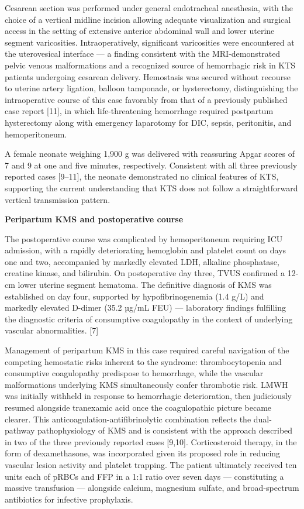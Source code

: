 \documentclass[
  letterpaper,
  DIV=11,
  numbers=noendperiod]{scrartcl}
\begin{document}
Cesarean section was performed under general endotracheal anesthesia,
with the choice of a vertical midline incision allowing adequate
visualization and surgical access in the setting of extensive anterior
abdominal wall and lower uterine segment varicosities. Intraoperatively,
significant varicosities were encountered at the uterovesical interface
--- a finding consistent with the MRI-demonstrated pelvic venous
malformations and a recognized source of hemorrhagic risk in KTS
patients undergoing cesarean delivery. Hemostasis was secured without
recourse to uterine artery ligation, balloon tamponade, or hysterectomy,
distinguishing the intraoperative course of this case favorably from
that of a previously published case report {[}11{]}, in which
life-threatening hemorrhage required postpartum hysterectomy along with
emergency laparotomy for DIC, sepsis, peritonitis, and hemoperitoneum.

A female neonate weighing 1,900 g was delivered with reassuring Apgar
scores of 7 and 9 at one and five minutes, respectively. Consistent with
all three previously reported cases {[}9--11{]}, the neonate
demonstrated no clinical features of KTS, supporting the current
understanding that KTS does not follow a straightforward vertical
transmission pattern.

\textbf{Peripartum KMS and postoperative course}

The postoperative course was complicated by hemoperitoneum requiring ICU
admission, with a rapidly deteriorating hemoglobin and platelet count on
days one and two, accompanied by markedly elevated LDH, alkaline
phosphatase, creatine kinase, and bilirubin. On postoperative day three,
TVUS confirmed a 12-cm lower uterine segment hematoma. The definitive
diagnosis of KMS was established on day four, supported by
hypofibrinogenemia (1.4 g/L) and markedly elevated D-dimer (35.2 µg/mL
FEU) --- laboratory findings fulfilling the diagnostic criteria of
consumptive coagulopathy in the context of underlying vascular
abnormalities. {[}7{]}

Management of peripartum KMS in this case required careful navigation of
the competing hemostatic risks inherent to the syndrome:
thrombocytopenia and consumptive coagulopathy predispose to hemorrhage,
while the vascular malformations underlying KMS simultaneously confer
thrombotic risk. LMWH was initially withheld in response to hemorrhagic
deterioration, then judiciously resumed alongside tranexamic acid once
the coagulopathic picture became clearer. This
anticoagulation-antifibrinolytic combination reflects the dual-pathway
pathophysiology of KMS and is consistent with the approach described in
two of the three previously reported cases {[}9,10{]}. Corticosteroid
therapy, in the form of dexamethasone, was incorporated given its
proposed role in reducing vascular lesion activity and platelet
trapping. The patient ultimately received ten units each of pRBCs and
FFP in a 1:1 ratio over seven days --- constituting a massive
transfusion --- alongside calcium, magnesium sulfate, and broad-spectrum
antibiotics for infective prophylaxis.
\end{document}
